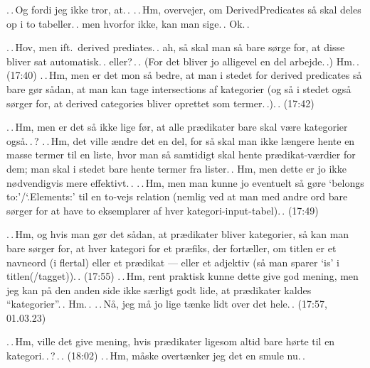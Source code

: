 \documentclass{report}
\begin{document}
.\,.\,Og fordi jeg ikke tror, at.\,. .\,.\,Hm, overvejer, om DerivedPredicates så skal deles op i to tabeller.\,. men hvorfor ikke, kan man sige.\,. Ok.\,. 

.\,.\,Hov, men ift.\ derived prediates.\,. ah, så skal man så bare sørge for, at disse bliver sat automatisk.\,. eller?\,.\,. (For det bliver jo alligevel en del arbejde.\,.) Hm.\,. (17:40) .\,.\,Hm, men er det mon så bedre, at man i stedet for derived predicates så bare gør sådan, at man kan tage intersections af kategorier (og så i stedet også sørger for, at derived categories bliver oprettet som termer.\,.).\,. (17:42) 

.\,.\,Hm, men er det så ikke lige før, at alle prædikater bare skal være kategorier også.\,.\,? .\,.\,Hm, det ville ændre det en del, for så skal man ikke længere hente en masse termer til en liste, hvor man så samtidigt skal hente prædikat-værdier for dem; man skal i stedet bare hente termer fra lister.\,. Hm, men dette er jo ikke nødvendigvis mere effektivt.\,. .\,.\,Hm, men man kunne jo eventuelt så gøre `belongs to:'/`.Elements:' til en to-vejs relation (nemlig ved at man med andre ord bare sørger for at have to eksemplarer af hver kategori-input-tabel).\,. (17:49) 

.\,.\,Hm, og hvis man gør det sådan, at prædikater bliver kategorier, så kan man bare sørger for, at hver kategori for et præfiks, der fortæller, om titlen er et navneord (i flertal) eller et prædikat --- eller et adjektiv (så man sparer `is' i titlen(/tagget)).\,. (17:55) .\,.\,Hm, rent praktisk kunne dette give god mening, men jeg kan på den anden side ikke særligt godt lide, at prædikater kaldes ``kategorier''.\,. Hm.\,. .\,.\,Nå, jeg må jo lige tænke lidt over det hele.\,. (17:57, 01.03.23)

.\,.\,Hm, ville det give mening, hvis prædikater ligesom altid bare hørte til en kategori.\,.\,?\,.\,. (18:02) .\,.\,Hm, måske overtænker jeg det en smule nu.\,. 
\end{document}
